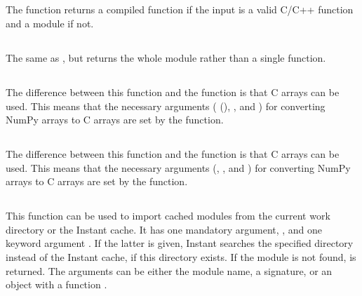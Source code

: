 \subsection[inline]{}

The function  returns a compiled function if the input is
a valid C/C++ function and a module if not.

\subsection[inline\_module]{}

The same as , but returns the whole module rather than a
single function.

\subsection[inline\_with\_numpy]{}

The difference between this function and the  function is
that C arrays can be used. This means that the necessary arguments
( (), ,
and ) for converting NumPy arrays to C arrays are
set by the function.

\subsection[inline\_module\_with\_numpy]{}

The difference between this function and the 
function is that C arrays can be used.  This means that the necessary
arguments (, ,
and ) for converting NumPy arrays to C arrays are
set by the function.

\subsection[import\_module]{}

This function can be used to import cached modules from the current work
directory or the Instant cache. It has one mandatory argument,
, and one keyword argument . If the latter is
given, Instant searches the specified directory instead of the Instant
cache, if this directory exists. If the module is not
found,  is returned. The  arguments can be
either the module name, a signature, or an object with a
function .

